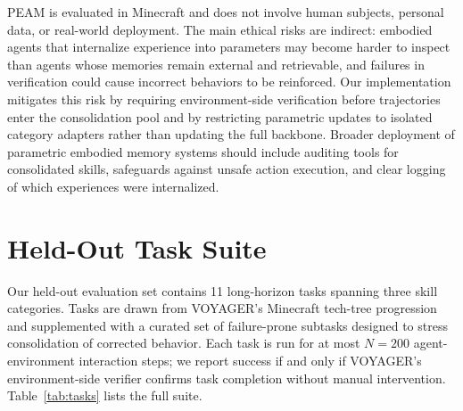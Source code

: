 \documentclass[11pt]{article}
\begin{document}
PEAM is evaluated in Minecraft and does not involve human subjects, personal data, or real-world deployment. The main ethical risks are indirect: embodied agents that internalize experience into parameters may become harder to inspect than agents whose memories remain external and retrievable, and failures in verification could cause incorrect behaviors to be reinforced. Our implementation mitigates this risk by requiring environment-side verification before trajectories enter the consolidation pool and by restricting parametric updates to isolated category adapters rather than updating the full backbone. Broader deployment of parametric embodied memory systems should include auditing tools for consolidated skills, safeguards against unsafe action execution, and clear logging of which experiences were internalized.



%



%
%
%

\appendix

\section{Held-Out Task Suite}
\label{app:tasks}

Our held-out evaluation set contains 11 long-horizon tasks
spanning three skill categories. Tasks are drawn from VOYAGER's
Minecraft tech-tree progression and supplemented with a curated
set of failure-prone subtasks designed to stress consolidation
of corrected behavior. Each task is run for at most $N=200$
agent-environment interaction steps; we report success if and
only if VOYAGER's environment-side verifier confirms task
completion without manual intervention. Table~\ref{tab:tasks}
lists the full suite.
\end{document}
